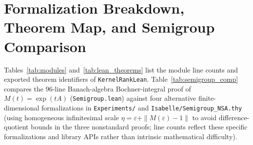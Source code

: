 \documentclass[11pt,a4paper]{article}
\theoremstyle{plain}
\theoremstyle{definition}
\begin{document}
\appendix

\section{Formalization Breakdown, Theorem Map, and Semigroup Comparison}\label{app:formal}

Tables~\ref{tab:modules} and~\ref{tab:lean_theorems} list the module line counts and exported theorem identifiers of \texttt{KernelRankLean}. Table~\ref{tab:semigroup_comp} compares the $96$-line Banach-algebra Bochner-integral proof of $M(t) = \exp(tA)$ (\texttt{Semigroup.lean}) against four alternative finite-dimensional formalizations in \texttt{Experiments/} and \texttt{Isabelle/Semigroup\_NSA.thy}~\cite{fleuriot2000mechanizing,holzl2013type} (using homogeneous infinitesimal scale $\eta = \varepsilon + \|M(\varepsilon) - 1\|$ to avoid difference-quotient bounds in the three nonstandard proofs; line counts reflect these specific formalizations and library APIs rather than intrinsic mathematical difficulty).
\end{document}
